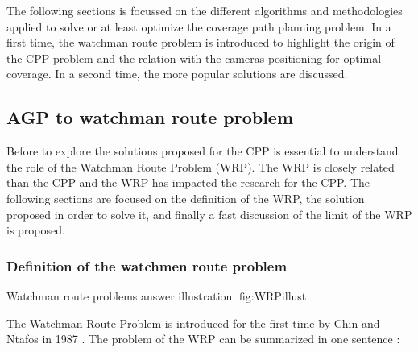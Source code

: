   The following sections is focussed on the different algorithms and methodologies applied to solve or at least optimize the coverage path planning problem. In a first time, the watchman route problem is introduced to highlight the origin of the CPP problem and the relation with the cameras positioning for optimal coverage. In a second time, the more popular solutions are discussed.
 


%
%


\subsection{AGP  to watchman route problem}\label{sec:WRP}


Before to explore the solutions proposed for the CPP is essential to understand the role of the Watchman Route Problem (WRP). The WRP is closely related than the CPP and the WRP has impacted the research for the CPP. 
The following sections are focused on the definition of the WRP, the solution proposed in order to solve it, and finally a fast discussion of the limit of the WRP  is proposed.
 
\subsubsection{Definition of the watchmen route problem }

 \begin{mfigures}[!]
{Watchman route problems answer illustration. }{fig:WRPillust} \centering
{}
\hspace{1cm}
\end{mfigures}	
The Watchman Route Problem is introduced for the first time by Chin and Ntafos in 1987 \cite{54*chin1988}. The problem of the WRP can be summarized in one sentence :

